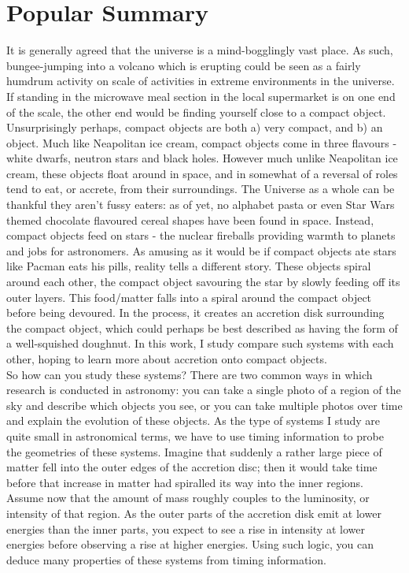 \chapter*{Popular Summary}
It is generally agreed that the universe is a mind-bogglingly vast place. As such, bungee-jumping into a volcano which is erupting could be seen as a fairly humdrum activity on scale of activities in extreme environments in the universe. If standing in the microwave meal section in the local supermarket is on one end of the scale, the other end would be finding yourself close to a compact object. Unsurprisingly perhaps, compact objects are both a) very compact, and b) an object. Much like Neapolitan ice cream, compact objects come in three flavours - white dwarfs, neutron stars and black holes. However much unlike Neapolitan ice cream, these objects float around in space, and in somewhat of a reversal of roles tend to eat, or accrete, from their surroundings. The Universe as a whole can be thankful they aren't fussy eaters: as of yet, no alphabet pasta or even Star Wars themed chocolate flavoured cereal shapes have been found in space. Instead, compact objects feed on stars - the nuclear fireballs providing warmth to planets and jobs for astronomers. As amusing as it would be if compact objects ate stars like Pacman eats his pills, reality tells a different story. These objects spiral around each other, the compact object savouring the star by slowly feeding off its outer layers. This food/matter falls into a spiral around the compact object before being devoured. In the process, it creates an accretion disk surrounding the compact object, which could perhaps be best described as having the form of a well-squished doughnut. In this work, I study compare such systems with each other, hoping to learn more about accretion onto compact objects. \\

So how can you study these systems? There are two common ways in which research is conducted in astronomy: you can take a single photo of a region of the sky and describe which objects you see, or you can take multiple photos over time and explain the evolution of these objects. As the type of systems I study are quite small in astronomical terms, we have to use timing information to probe the geometries of these systems. Imagine that suddenly a rather large piece of matter fell into the outer edges of the accretion disc; then it would take time before that increase in matter had spiralled its way into the inner regions. Assume now that the amount of mass roughly couples to the luminosity, or intensity of that region. As the outer parts of the accretion disk emit at lower energies than the inner parts, you expect to see a rise in intensity at lower energies before observing a rise at higher energies. Using such logic, you can deduce many properties of these systems from timing information.\\

